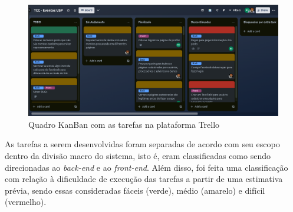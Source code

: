 \begin{figure}[h]
    \centering
    \includegraphics[width=1\textwidth]{figuras/trello.png}
    \caption{Quadro KanBan com as tarefas na plataforma Trello}
    \label{fig:enter-label}
\end{figure}

As tarefas a serem desenvolvidas foram separadas de acordo com seu escopo
dentro da divisão macro do sistema, isto é, eram classificadas como sendo
direcionadas ao \textit{back-end} e ao \textit{front-end}. Além disso, foi
feita uma classificação com relação à dificuldade de execução das tarefas a
partir de uma estimativa prévia, sendo essas consideradas fáceis (verde), médio
(amarelo) e difícil (vermelho).

